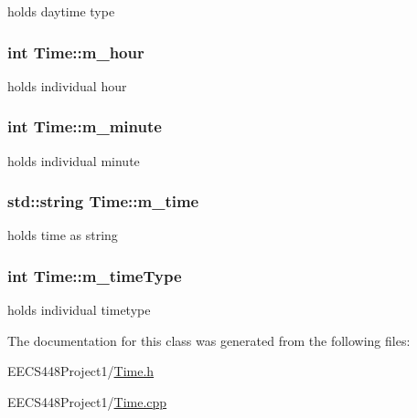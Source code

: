 holds daytime type 

\subsubsection[{\texorpdfstring{m\+\_\+hour}{m_hour}}]{\setlength{\rightskip}{0pt plus 5cm}int Time\+::m\+\_\+hour\hspace{0.3cm}{\ttfamily [private]}}\hypertarget{classTime_ae1c5e59897218c6e143bf257472d4d0a}{}\label{classTime_ae1c5e59897218c6e143bf257472d4d0a}


holds individual hour 

\subsubsection[{\texorpdfstring{m\+\_\+minute}{m_minute}}]{\setlength{\rightskip}{0pt plus 5cm}int Time\+::m\+\_\+minute\hspace{0.3cm}{\ttfamily [private]}}\hypertarget{classTime_a52a8fa26ca15a3e7052735a6431389e8}{}\label{classTime_a52a8fa26ca15a3e7052735a6431389e8}


holds individual minute 

\subsubsection[{\texorpdfstring{m\+\_\+time}{m_time}}]{\setlength{\rightskip}{0pt plus 5cm}std\+::string Time\+::m\+\_\+time\hspace{0.3cm}{\ttfamily [private]}}\hypertarget{classTime_ab36d723cbc54f228022881c08a6b7214}{}\label{classTime_ab36d723cbc54f228022881c08a6b7214}


holds time as string 

\subsubsection[{\texorpdfstring{m\+\_\+time\+Type}{m_timeType}}]{\setlength{\rightskip}{0pt plus 5cm}int Time\+::m\+\_\+time\+Type\hspace{0.3cm}{\ttfamily [private]}}\hypertarget{classTime_a5c5860d4bbda747ff81a93269da9a36c}{}\label{classTime_a5c5860d4bbda747ff81a93269da9a36c}


holds individual timetype 



The documentation for this class was generated from the following files\+:\begin{DoxyCompactItemize}
\item 
E\+E\+C\+S448\+Project1/\hyperlink{Time_8h}{Time.\+h}\item 
E\+E\+C\+S448\+Project1/\hyperlink{Time_8cpp}{Time.\+cpp}\end{DoxyCompactItemize}
